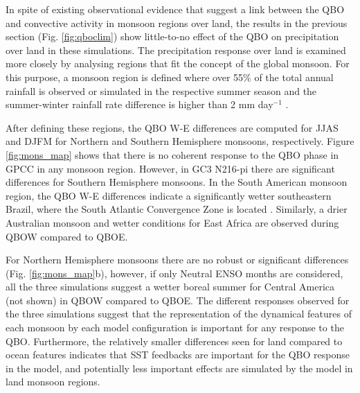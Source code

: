 In spite of existing observational evidence \citep{collimore2003,liess2012,gray2018} that suggest a link between the QBO and convective activity in monsoon regions over land, the results in the previous section (Fig. \ref{fig:qboclim}) show little-to-no effect of the QBO on precipitation over land in these simulations. 
The precipitation response over land is examined more closely by analysing regions that fit the concept of the global monsoon. For this purpose, a monsoon region is defined where over 55\% of the total annual rainfall is observed or simulated in the respective summer season and the summer-winter rainfall rate difference is higher than  2 mm day$^{-1}$ \citep{wang2008,wang2017,wang2021monsoons}. 

After defining these regions, the QBO W-E differences are computed for JJAS and DJFM for Northern and Southern Hemisphere monsoons, respectively. 
Figure \ref{fig:mons_map} shows that there is no coherent response to the QBO phase in  GPCC in any monsoon region. However, in GC3 N216-pi there are significant differences for Southern Hemisphere monsoons. In the South American monsoon region, the QBO W-E differences indicate a significantly wetter southeastern Brazil, where the South Atlantic Convergence Zone is located \citep{zilli2019}. Similarly, a drier Australian monsoon and wetter conditions for East Africa are observed during QBOW compared to QBOE.

For Northern Hemisphere monsoons there are no robust or significant differences (Fig. \ref{fig:mons_map}b), however, if only Neutral ENSO months are considered, all the three simulations suggest a wetter boreal summer for Central America (not shown) in QBOW compared to QBOE. 
The different responses observed for the three simulations suggest that the representation of the dynamical features of each monsoon by each model configuration is important for any response to the QBO. Furthermore, the relatively smaller differences seen for land compared to ocean features indicates that SST feedbacks are important for the QBO response in the model, and potentially less important effects are simulated by the model in land monsoon regions.


